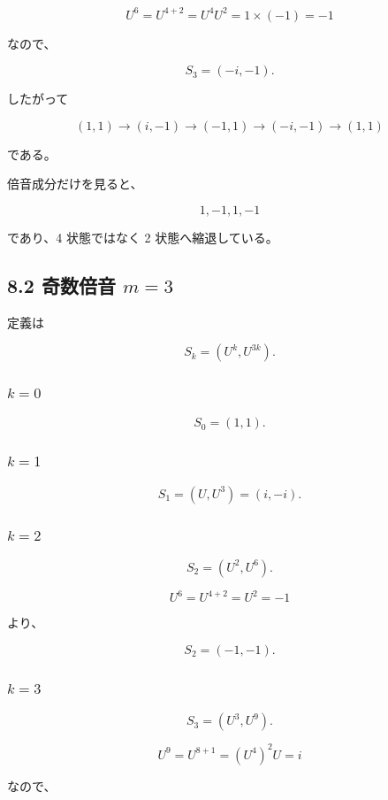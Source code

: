 \documentclass[
  a4paper,
]{ltjsarticle}
\begin{document}
\[
U^6
=
U^{4+2}
=
U^4U^2
=
1\times(-1)
=
-1
\]

なので、

\[
S_3
=
(-i,-1).
\]

したがって

\[
\boxed{
(1,1)
\to
(i,-1)
\to
(-1,1)
\to
(-i,-1)
\to
(1,1)
}
\]

である。

倍音成分だけを見ると、

\[
1,-1,1,-1
\]

であり、4 状態ではなく 2 状態へ縮退している。

\subsection{\texorpdfstring{8.2 奇数倍音
\(m=3\)}{8.2 奇数倍音 m=3}}\label{ux5947ux6570ux500dux97f3-m3}

定義は

\[
S_k
=
(U^k,U^{3k}).
\]

\subsubsection{\texorpdfstring{\(k=0\)}{k=0}}\label{k0-1}

\[
S_0
=
(1,1).
\]

\subsubsection{\texorpdfstring{\(k=1\)}{k=1}}\label{k1-1}

\[
S_1
=
(U,U^3)
=
(i,-i).
\]

\subsubsection{\texorpdfstring{\(k=2\)}{k=2}}\label{k2-1}

\[
S_2
=
(U^2,U^6).
\]

\[
U^6
=
U^{4+2}
=
U^2
=
-1
\]

より、

\[
S_2
=
(-1,-1).
\]

\subsubsection{\texorpdfstring{\(k=3\)}{k=3}}\label{k3-1}

\[
S_3
=
(U^3,U^9).
\]

\[
U^9
=
U^{8+1}
=
(U^4)^2U
=
i
\]

なので、
\end{document}
